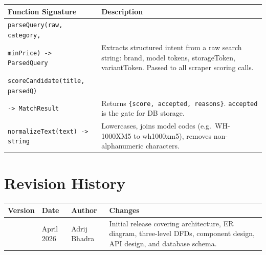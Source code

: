 \documentclass[12pt,a4paper]{report}
\begin{document}
\begin{longtable}{L{4.5cm} L{8.5cm}}
  \toprule
  \textbf{Function Signature} & \textbf{Description} \\
  \midrule
  \endhead
  \texttt{parseQuery(raw, category,}\\
  \texttt{minPrice) -> ParsedQuery} &
    Extracts structured intent from a raw search string: brand, model tokens,
    storageToken, variantToken. Passed to all scraper scoring calls. \\[3pt]
  \texttt{scoreCandidate(title, parsedQ)}\\
  \texttt{-> MatchResult} &
    Returns \texttt{\{score, accepted, reasons\}}.
    \texttt{accepted} is the gate for DB storage. \\[3pt]
  \texttt{normalizeText(text) -> string} &
    Lowercases, joins model codes (e.g.\ WH-1000XM5 to wh1000xm5),
    removes non-alphanumeric characters. \\
  \bottomrule
\end{longtable}

\chapter*{Revision History}
\begin{longtable}{C{1.5cm} C{2cm} L{4cm} L{5cm}}
  \toprule
  \textbf{Version} & \textbf{Date} & \textbf{Author} & \textbf{Changes} \\
  \midrule
  \endhead
  \bottomrule
   & April 2026 & Adrij Bhadra &
    Initial release covering architecture, ER diagram, three-level DFDs,
    component design, API design, and database schema. \\
  \bottomrule
\end{longtable}
\end{document}
